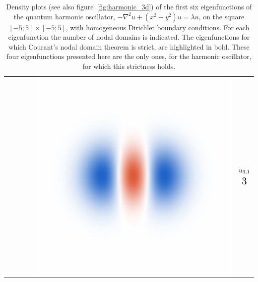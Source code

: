 \begin{table}
\begin{center}
\begin{tabular}{rlrl|rl|}
      \cline{3-6}                                                                                                          &                                                      &                                                                                                                      &                                & \parbox[c]{\hoWidth}{\vspace{2pt}\includegraphics[width=\linewidth]{img/chapter3/counting/harmonic/6c.png}\vspace{2pt}} & $ \begin{matrix} u_{3,1} \vspace{5pt}\\ \scalebox{1.5}{$3$} \end{matrix} $  \\
    \end{tabular}
    \caption{\label{tab:courant_harmonic}Density plots (see also figure~\ref{fig:harmonic_3d}) of the first six eigenfunctions of the quantum harmonic oscillator, $-\nabla^2 u + (x^2+y^2) u = \lambda u$, on the square $[-5;5]\times [-5;5]$, with homogeneous Dirichlet boundary conditions. For each eigenfunction the number of nodal domains is indicated. The eigenfunctions for which Courant's nodal domain theorem is strict, are highlighted in bold. These four eigenfunctions presented here are the only ones, for the harmonic oscillator, for which this strictness holds. }
  \end{center}
\end{table}

